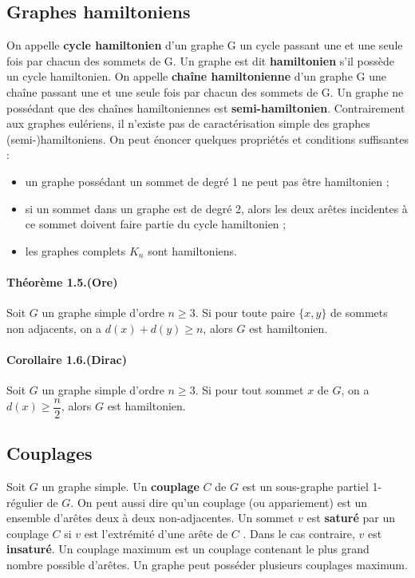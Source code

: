 \subsection{Graphes hamiltoniens}
On appelle \textbf{cycle hamiltonien} d'un graphe G un cycle passant une et une seule fois par
chacun des sommets de G. Un graphe est dit \textbf{hamiltonien} s'il possède un cycle hamiltonien.
On appelle \textbf{chaîne hamiltonienne} d'un graphe G une chaîne passant une et une seule fois
par chacun des sommets de G. Un graphe ne possédant que des chaînes hamiltoniennes est
\textbf{semi-hamiltonien}.
Contrairement aux graphes eulériens, il n'existe pas de caractérisation simple des graphes\\
(semi-)hamiltoniens. On peut énoncer quelques propriétés et conditions suffisantes :
\begin{itemize}
	\item un graphe possédant un sommet de degré 1 ne peut pas être hamiltonien ;
	\item si un sommet dans un graphe est de degré 2, alors les deux arêtes incidentes à ce sommet
	doivent faire partie du cycle hamiltonien ;
	\item les graphes complets $ K_{n} $ sont hamiltoniens.
\end{itemize}

\paragraph*{Théorème 1.5.(Ore)} Soit $G$ un graphe simple d'ordre $n\geq 3$. Si pour toute paire $\{x,y\}$ 
de sommets non adjacents, on a $d(x) + d(y) \geq n$, alors $G$ est hamiltonien.

\paragraph*{Corollaire 1.6.(Dirac)} Soit $G$ un graphe simple d'ordre $n\geq 3$. Si pour tout sommet $x$ de $G$,
on a $d(x) \geq \dfrac{n}{2}$, alors $G$ est hamiltonien.

\subsection{Couplages}
Soit $ G $ un graphe simple. Un \textbf{couplage} $ C $ de $ G $ est un sous-graphe partiel 1-régulier de $ G$.
On peut aussi dire qu'un couplage (ou appariement) est un ensemble d'arêtes deux à deux
non-adjacentes.
Un sommet $ v $ est \textbf{saturé} par un couplage $ C $ si $ v $ est l'extrémité d'une arête de $ C $ . Dans le
cas contraire, $ v $ est \textbf{insaturé}.
Un couplage maximum est un couplage contenant le plus grand nombre possible d'arêtes.
Un graphe peut posséder plusieurs couplages maximum.

